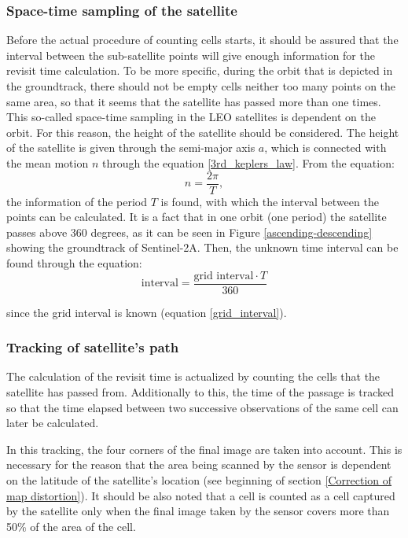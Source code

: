 \bigskip
\subsubsection{Space-time sampling of the satellite}
\bigskip

Before the actual procedure of counting cells starts, it should be assured that the interval between the sub-satellite points will give enough information for the revisit time calculation. To be more specific, during the orbit that is depicted in the groundtrack, there should not be empty cells neither too many points on the same area, so that it seems that the satellite has passed more than one times. This so-called space-time sampling in the LEO satellites is dependent on the orbit. For this reason, the height of the satellite should be considered. The height of the satellite is given through the semi-major axis $a$, which is connected with the mean motion $n$ through the equation \ref{3rd_keplers_law}. From the equation: $$n = \frac{2 \pi}{T}, $$
the information of the period $T$ is found, with which the interval between the points can be calculated. It is a fact that in one orbit (one period) the satellite passes above 360 degrees, as it can be seen in Figure \ref{ascending-descending} showing the groundtrack of Sentinel-2A. Then, the unknown time interval can be found through the equation:
\begin{equation}
\text{interval} = \frac{\text{grid interval} \cdot T}{360}
\end{equation}

since the grid interval is known (equation \ref{grid_interval}).


\bigskip
\subsubsection{Tracking of satellite's path}
\bigskip

The calculation of the revisit time is actualized by counting the cells that the satellite has passed from. Additionally to this, the time of the passage is tracked so that the time elapsed between two successive observations of the same cell can later be calculated. 

In this tracking, the four corners of the final image are taken into account. This is necessary for the reason that the area being scanned by the sensor is dependent on the latitude of the satellite's location (see beginning of section \ref{Correction of map distortion}). It should be also noted that a cell is counted as a cell captured by the satellite only when the final image taken by the sensor covers more than 50\% of the area of the cell.

